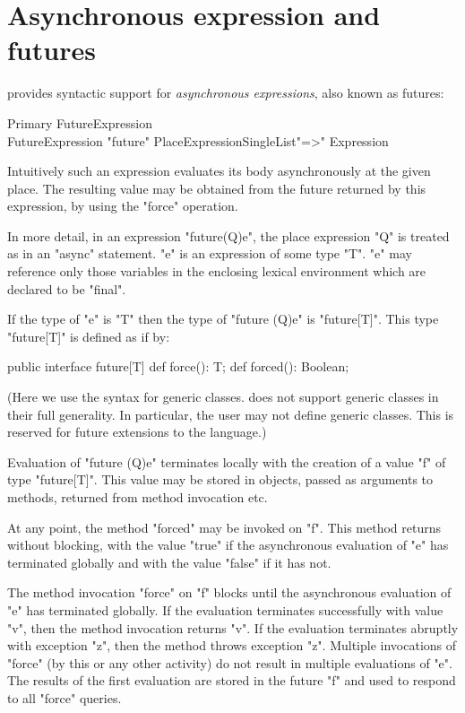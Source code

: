 
\section{Asynchronous expression and futures}\label{XtenFutures}

\Xten{} provides syntactic support for {\em asynchronous expressions}, also
known as futures:

\begin{grammar}
Primary \: FutureExpression \\
FutureExpression \:
  \xcd"future" PlaceExpressionSingleList\opt \xcd"=>" Expression
\end{grammar} 

Intuitively such an expression evaluates its body asynchronously at
the given place. The resulting value may be obtained from the future
returned by this expression, by using the \xcd"force" operation.

In more detail, in an expression \xcd"future(Q){e}", the place
expression \xcd"Q" is treated as in an \xcd"async" statement. \xcd"e"
is an expression of some type \xcd"T". \xcd"e" may reference only
those variables in the enclosing lexical environment which are
declared to be \xcd"final".

If the type of \xcd"e" is \xcd"T" then the type of
\xcd"future (Q){e}" is \xcd"future[T]".  This 
type \xcd"future[T]" is defined as if by:
\begin{xten}
public interface future[T] {
  def force(): T;
  def forced(): Boolean;
}
\end{xten}

(Here we use the syntax for generic classes. \XtenCurrVer{} does not support
generic classes in their full generality. In particular, the user may
not define generic classes. This is reserved for future extensions to the
language.)

Evaluation of \xcd"future (Q){e}" terminates locally with the creation
of a value \xcd"f" of type \xcd"future[T]".  This value may be
stored in objects, passed as arguments to methods, returned from
method invocation etc. 

At any point, the method \xcd"forced" may be invoked on \xcd"f". This
method returns without blocking, with the value \xcd"true" if the
asynchronous evaluation of \xcd"e" has terminated globally and with
the value \xcd"false" if it has not.

The method invocation \xcd"force" on \xcd"f" blocks until the
asynchronous evaluation of \xcd"e" has terminated globally. If the
evaluation terminates successfully with value \xcd"v", then the method
invocation returns \xcd"v". If the evaluation terminates abruptly with
exception \xcd"z", then the method throws exception \xcd"z". Multiple
invocations of \xcd"force" (by this or any other activity) do not
result in multiple evaluations of \xcd"e". The results of the first
evaluation are stored in the future \xcd"f" and used to respond to all
\xcd"force" queries.


